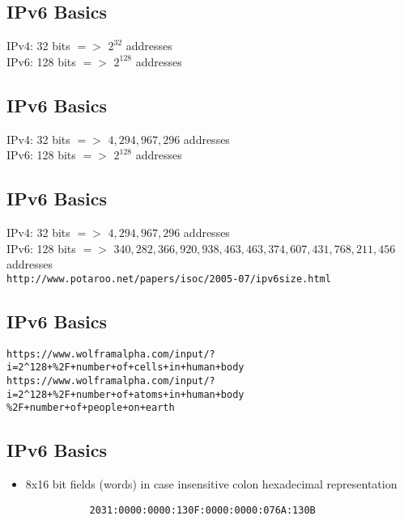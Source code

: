\documentclass[xga]{xdvislides}
\begin{document}
\subsection{IPv6 Basics}
\Hugesize
\begin{center}
IPv4: 32 bits $=>$ $2^{32}$ addresses \\
\vspace{.5in}
IPv6: 128 bits $=>$ $2^{128}$ addresses
\end{center}
\Normalsize

\subsection{IPv6 Basics}
\Hugesize
\begin{center}
IPv4: 32 bits $=>$ $4,294,967,296$ addresses \\
\vspace{.5in}
IPv6: 128 bits $=>$ $2^{128}$ addresses
\end{center}
\Normalsize

\subsection{IPv6 Basics}
\Hugesize
\begin{center}
IPv4: 32 bits $=>$ $4,294,967,296$ addresses \\
\vspace{.5in}
IPv6: 128 bits $=>$ $340,282,366,920,938,463,463,374,607,431,768,211,456$ addresses \\
\vspace{.5in}
\verb+http://www.potaroo.net/papers/isoc/2005-07/ipv6size.html+
\end{center}
\Normalsize

\subsection{IPv6 Basics}
\verb|https://www.wolframalpha.com/input/?i=2^128+%2F+number+of+cells+in+human+body|
\verb|https://www.wolframalpha.com/input/?i=2^128+%2F+number+of+atoms+in+human+body|
\verb|%2F+number+of+people+on+earth|


\subsection{IPv6 Basics}
\begin{itemize}
	\item 8x16 bit fields (words) in case insensitive colon hexadecimal
		representation
\begin{verbatim}
           2031:0000:0000:130F:0000:0000:076A:130B
\end{verbatim}
\end{itemize}
\end{document}
